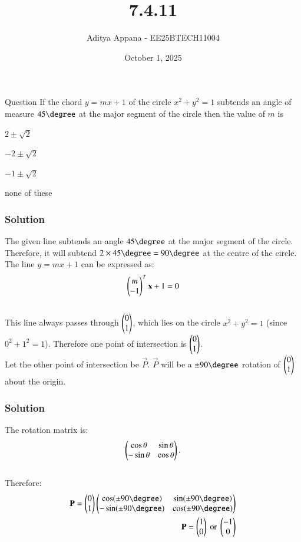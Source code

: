 \documentclass{beamer}
\title %
{7.4.11}
\date{October 1, 2025}
\author %
{Aditya Appana - EE25BTECH11004}
\begin{document}
\frame{\titlepage}
\begin{frame}{Question}
If the chord $y = mx + 1$ of the circle $x^2 + y^2 = 1$ subtends an angle of measure $45\degree$
at the major segment of the circle then the value of $m$ is
\begin{enumerate}
\begin{multicols}{4}
    \item $2 \pm \sqrt{2}$
    \item $-2 \pm \sqrt{2}$
    \item $-1 \pm \sqrt{2}$
    \item none of these
    
    \end{multicols}
\end{enumerate}\end{frame}



\begin{frame}[fragile]
    \frametitle{Solution}
The given line subtends an angle $45\degree$ at the major segment of the circle. Therefore, it will subtend $2\times 45\degree = 90\degree$ at the centre of the circle.\vspace{0.6cm}\\
The line $y = mx + 1$ can be expressed as:
\begin{align}
    \begin{pmatrix}m\\-1\end{pmatrix}^T\mathbf{x} + 1 =0
\end{align}\\
This line always passes through $\begin{pmatrix}0\\1\end{pmatrix}$, which lies on the circle $x^2 + y^2 = 1$ (since $0^2 + 1^2 = 1$). Therefore one point of intersection is $\begin{pmatrix}0\\1\end{pmatrix}$.\vspace{0.6cm}\\
Let the other point of intersection be $\vec{P}$. $\vec{P}$ will be a $\pm90\degree$ rotation of $\begin{pmatrix}0\\1\end{pmatrix}$ about the origin.
\end{frame}


\begin{frame}[fragile]
    \frametitle{Solution}
The rotation matrix is:
\begin{align}
\begin{pmatrix}\cos\theta & \sin\theta \\ -\sin\theta & \cos\theta\end{pmatrix}.
\end{align}\\
Therefore:
\begin{align}
\vec{P}= \myvec{0\\1}\myvec{\cos(\pm 90\degree) & \sin(\pm90\degree) \\ -\sin(\pm90\degree) & \cos(\pm90\degree)}\\
\vec{P} = \myvec{1\\0} \text{ or } \myvec{-1\\0}
\end{align}
\end{frame}
\end{document}
